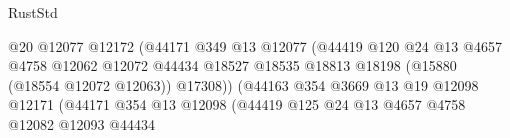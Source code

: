 \begin{lexlean}{RustStd}
\begin{coremodule}
                                                    @20
                                                    @12077
                                                    @12172
                                                    (@44171
                                                      @349
                                                      @13
                                                      @12077
                                                      (@44419
                                                        @120
                                                        @24
                                                        @13
                                                        @4657
                                                        @4758
                                                        @12062
                                                        @12072
                                                        @44434
                                                        @18527
                                                        @18535
                                                        @18813
                                                        @18198
                                                        (@15880 (@18554 @12072 @12063))
                                                        @17308))
                                                    (@44163
                                                      @354
                                                      @3669
                                                      @13
                                                      @19
                                                      @12098
                                                      @12171
                                                      (@44171
                                                        @354
                                                        @13
                                                        @12098
                                                        (@44419
                                                          @125
                                                          @24
                                                          @13
                                                          @4657
                                                          @4758
                                                          @12082
                                                          @12093
                                                          @44434

\end{coremodule}
\end{lexlean}
